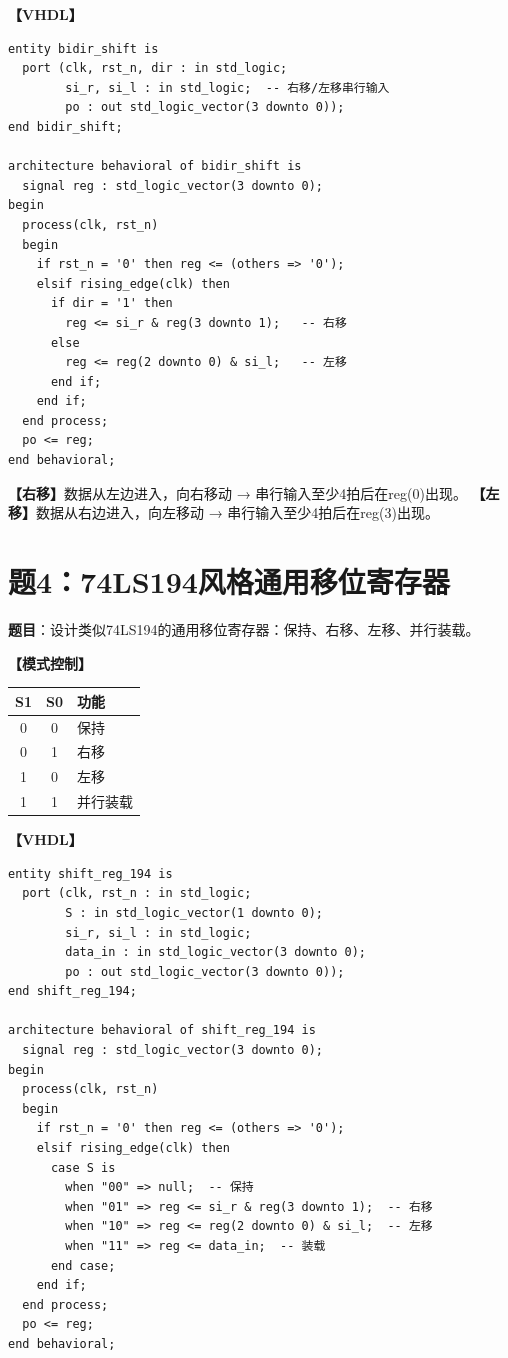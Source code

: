 \begin{solution}[完整解答]

\textbf{【VHDL】}
\begin{lstlisting}
entity bidir_shift is
  port (clk, rst_n, dir : in std_logic;
        si_r, si_l : in std_logic;  -- 右移/左移串行输入
        po : out std_logic_vector(3 downto 0));
end bidir_shift;

architecture behavioral of bidir_shift is
  signal reg : std_logic_vector(3 downto 0);
begin
  process(clk, rst_n)
  begin
    if rst_n = '0' then reg <= (others => '0');
    elsif rising_edge(clk) then
      if dir = '1' then
        reg <= si_r & reg(3 downto 1);   -- 右移
      else
        reg <= reg(2 downto 0) & si_l;   -- 左移
      end if;
    end if;
  end process;
  po <= reg;
end behavioral;
\end{lstlisting}

\textbf{【右移】}数据从左边进入，向右移动 → 串行输入至少4拍后在reg(0)出现。
\textbf{【左移】}数据从右边进入，向左移动 → 串行输入至少4拍后在reg(3)出现。

\end{solution}


\section{题4：74LS194风格通用移位寄存器}

\textbf{题目}：设计类似74LS194的通用移位寄存器：保持、右移、左移、并行装载。

\begin{solution}[完整解答]

\textbf{【模式控制】}
\begin{center}
\begin{tabular}{|c|c|l|}\hline
S1 & S0 & 功能 \\ \hline
0 & 0 & 保持 \\ \hline
0 & 1 & 右移 \\ \hline
1 & 0 & 左移 \\ \hline
1 & 1 & 并行装载 \\ \hline
\end{tabular}
\end{center}

\textbf{【VHDL】}
\begin{lstlisting}
entity shift_reg_194 is
  port (clk, rst_n : in std_logic;
        S : in std_logic_vector(1 downto 0);
        si_r, si_l : in std_logic;
        data_in : in std_logic_vector(3 downto 0);
        po : out std_logic_vector(3 downto 0));
end shift_reg_194;

architecture behavioral of shift_reg_194 is
  signal reg : std_logic_vector(3 downto 0);
begin
  process(clk, rst_n)
  begin
    if rst_n = '0' then reg <= (others => '0');
    elsif rising_edge(clk) then
      case S is
        when "00" => null;  -- 保持
        when "01" => reg <= si_r & reg(3 downto 1);  -- 右移
        when "10" => reg <= reg(2 downto 0) & si_l;  -- 左移
        when "11" => reg <= data_in;  -- 装载
      end case;
    end if;
  end process;
  po <= reg;
end behavioral;
\end{lstlisting}

\end{solution}


